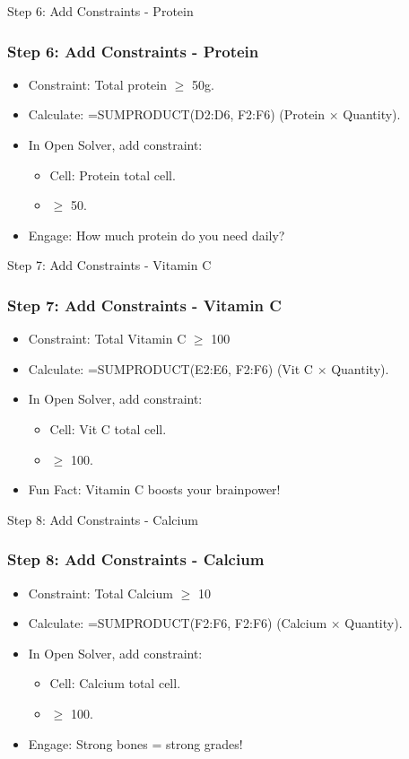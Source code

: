 \documentclass{beamer}
\begin{document}
\begin{frame}{Step 6: Add Constraints - Protein}
\frametitle{Step 6: Add Constraints - Protein}
\begin{itemize}
  \item Constraint: Total protein \(\geq\) 50g.
  \item Calculate: =SUMPRODUCT(D2:D6, F2:F6) (Protein × Quantity).
  \item In Open Solver, add constraint:
    \begin{itemize}
      \item Cell: Protein total cell.
      \item \(\geq\) 50.
    \end{itemize}
  \item Engage: How much protein do you need daily?
\end{itemize}
\end{frame}

\begin{frame}{Step 7: Add Constraints - Vitamin C}
\frametitle{Step 7: Add Constraints - Vitamin C}
\begin{itemize}
  \item Constraint: Total Vitamin C \(\geq\) 100%
  \item Calculate: =SUMPRODUCT(E2:E6, F2:F6) (Vit C × Quantity).
  \item In Open Solver, add constraint:
    \begin{itemize}
      \item Cell: Vit C total cell.
      \item \(\geq\) 100.
    \end{itemize}
  \item Fun Fact: Vitamin C boosts your brainpower!
\end{itemize}
\end{frame}

\begin{frame}{Step 8: Add Constraints - Calcium}
\frametitle{Step 8: Add Constraints - Calcium}
\begin{itemize}
  \item Constraint: Total Calcium \(\geq\) 10%
  \item Calculate: =SUMPRODUCT(F2:F6, F2:F6) (Calcium × Quantity).
  \item In Open Solver, add constraint:
    \begin{itemize}
      \item Cell: Calcium total cell.
      \item \(\geq\) 100.
    \end{itemize}
  \item Engage: Strong bones = strong grades!
\end{itemize}
\end{frame}
\end{document}
